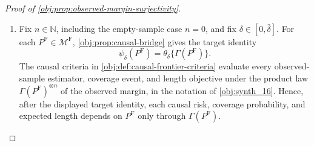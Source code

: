 \documentclass[11pt]{article}
\begin{document}
\begin{proof}[Proof of \cref{obj:prop:observed-margin-surjectivity}]
\begin{enumerate}
On the product space
\[
(\mathcal X\times\mathbb R)\times[0,1],
\qquad
\nu\otimes\lambda_{[0,1]},
\]
define
\[
g_x(a,\upsilon)=\mathfrak q((x,a),\upsilon),
\qquad
Y(a)=g_X(a,U),
\qquad
Y=g_X(A,U).
\]
Because \(K^\star=K^{\mathrm{raw}}\) \(\nu\)-a.e., the law of \((X,A,Y)\) is exactly \(P\).  The displayed structural identities \(Y(a)=g_X(a,U)\) and \(Y=g_X(A,U)\) also give the simultaneous consistency condition in \cref{obj:def:full-data-model-class}.  For bounded Borel \(\varphi:\mathbb R\to\mathbb R\) and \(\chi:[0,1]\to\mathbb R\), the product construction yields, for every \(x\),
\[
p_x
\int_{\{X=x\}}\varphi(A)\chi(U)\,dP^{\mathrm F}
=
\left(\int_{\{X=x\}}\varphi(A)\,dP^{\mathrm F}\right)
\left(\int_{\{X=x\}}\chi(U)\,dP^{\mathrm F}\right),
\]
which is the exchangeability condition in \cref{obj:def:full-data-model-class}.  Finally, for \(a\in[0,\bar\delta]\),
\[
m_x^{\mathrm F}(a)
=
p_x^{-1}\int_{\{X=x\}}g_x(a,U)\,dP^{\mathrm F}
=
\int_0^1\mathfrak q((x,a),\upsilon)\,d\lambda_{[0,1]}(\upsilon)
=
\int y\,K^\star_{(x,a)}(dy)
=
m(x,a)
=
\mu_x^P(a).
\]
Thus \(a\mapsto m_x^{\mathrm F}(a)\) is continuous on \([0,\bar\delta]\).  For the remainder of the proof, write
\[
\Gamma(P^{\mathrm F})
:=
\text{the observed }(X,A,Y)\text{-margin of the full-data law package }P^{\mathrm F}.
\]
The constructed package \(P^{\mathrm F}\) belongs to \(\mathcal M^{\mathrm F}\), and its observed margin is \(P\).  Hence
\[
\forall P\in\mathcal M\quad \exists P^{\mathrm F}\in\mathcal M^{\mathrm F}
\quad\text{with}\quad \Gamma(P^{\mathrm F})=P.
\]
This proves observed-margin surjectivity. %

\item Fix \(n\in\mathbb N\), including the empty-sample case \(n=0\), and fix \(\delta\in[0,\bar\delta]\).  For each \(P^{\mathrm F}\in\mathcal M^{\mathrm F}\), \cref{obj:prop:causal-bridge} gives the target identity
\[
\psi_\delta(P^{\mathrm F})
=
\theta_\delta\{\Gamma(P^{\mathrm F})\}.
\]
The causal criteria in \cref{obj:def:causal-frontier-criteria} evaluate every observed-sample estimator, coverage event, and length objective under the product law \(\Gamma(P^{\mathrm F})^{\otimes n}\) of the observed margin, in the notation of \cref{obj:synth_16}.  Hence, after the displayed target identity, each causal risk, coverage probability, and expected length depends on \(P^{\mathrm F}\) only through \(\Gamma(P^{\mathrm F})\). %


\end{enumerate}
\end{proof}
\end{document}

